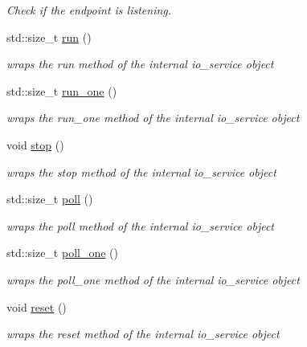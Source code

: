 \begin{DoxyCompactItemize}
\begin{DoxyCompactList}\small\item\em Check if the endpoint is listening. \end{DoxyCompactList}\item 
std\+::size\+\_\+t \hyperlink{classwebsocketpp_1_1transport_1_1asio_1_1endpoint_a5c457ea6734a1d8aafe6c6f364996dfe}{run} ()
\begin{DoxyCompactList}\small\item\em wraps the run method of the internal io\+\_\+service object \end{DoxyCompactList}\item 
std\+::size\+\_\+t \hyperlink{classwebsocketpp_1_1transport_1_1asio_1_1endpoint_a06b42e739e095b5ec489b59a655b2242}{run\+\_\+one} ()
\begin{DoxyCompactList}\small\item\em wraps the run\+\_\+one method of the internal io\+\_\+service object \end{DoxyCompactList}\item 
void \hyperlink{classwebsocketpp_1_1transport_1_1asio_1_1endpoint_a5aaf6de5a0a7f868c60f5d611a8e399c}{stop} ()
\begin{DoxyCompactList}\small\item\em wraps the stop method of the internal io\+\_\+service object \end{DoxyCompactList}\item 
std\+::size\+\_\+t \hyperlink{classwebsocketpp_1_1transport_1_1asio_1_1endpoint_aa73831b3e81e61cd95bfbfab799a41b7}{poll} ()
\begin{DoxyCompactList}\small\item\em wraps the poll method of the internal io\+\_\+service object \end{DoxyCompactList}\item 
std\+::size\+\_\+t \hyperlink{classwebsocketpp_1_1transport_1_1asio_1_1endpoint_ae413ac572300c418cfd822845960cc6c}{poll\+\_\+one} ()
\begin{DoxyCompactList}\small\item\em wraps the poll\+\_\+one method of the internal io\+\_\+service object \end{DoxyCompactList}\item 
void \hyperlink{classwebsocketpp_1_1transport_1_1asio_1_1endpoint_ac79a1a69f86df035471ccdc9f4aea351}{reset} ()
\begin{DoxyCompactList}\small\item\em wraps the reset method of the internal io\+\_\+service object \end{DoxyCompactList}\item 

\end{DoxyCompactItemize}
